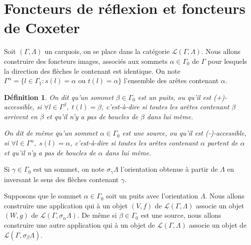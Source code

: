 \documentclass[a4paper,10pt]{article}
\newtheorem{defi}[thm]{Définition}%
\begin{document}
\clearpage
\section{Foncteurs de réflexion et foncteurs de Coxeter}
Soit $(\Gamma,\Lambda)$ un carquois, on se place dans la catégorie $\mathscr{L}(\Gamma,\Lambda)$. Nous allons construire des foncteurs images, associés aux sommets $\alpha \in \Gamma_{0}$ de $\Gamma$ pour lesquels la direction des flèches le contenant est identique. On note $\Gamma^{\alpha}=\{ l\in \Gamma_{1} : s(l)=\alpha\text{ ou }t(l)=\alpha\}$ l'ensemble des arêtes contenant $\alpha$.

\begin{defi}
	On dit qu'un sommet $\beta \in \Gamma_{0}$ est un \emph{puits}, ou qu'il est (+)-accessible, si $\forall l \in \Gamma^{\beta},\; t(l)=\beta$, c'est-à-dire si toutes les arêtes contenant $\beta$ arrivent en $\beta$ et qu'il n'y a pas de boucles de $\beta$ dans lui même.

	On dit de même qu'un sommet $\alpha \in \Gamma_{0}$ est une \emph{source}, ou qu'il est (-)-accessible, si $\forall l \in \Gamma^{\alpha},\; s(l)=\alpha$, c'est-à-dire si toutes les arêtes contenant $\alpha$ partent de $\alpha$ et qu'il n'y a pas de boucles de $\alpha$ dans lui même.
\end{defi}


Si $\gamma \in \Gamma_0$ est un sommet, on note $\sigma_{\gamma}\Lambda$ l'orientation obtenue à partir de $\Lambda$ en inversant le sens des flèches contenant $\gamma$.

Supposons que le sommet $\alpha \in \Gamma_{0}$ soit un puits avec l'orientation $\Lambda$.  Nous allons construire une application qui à un objet $(V,f)$ de $\mathscr{L}(\Gamma,\Lambda)$ associe un objet $(W,g)$ de $\mathscr{L}(\Gamma,\sigma_{\alpha}\Lambda)$. De même si $\beta \in \Gamma_0$ est une source, nous allons construire une autre application qui à un objet de $\mathscr L(\Gamma,\Lambda)$ associe un objet de $\mathscr L(\Gamma,\sigma_{\beta}\Lambda)$. 
\end{document}
